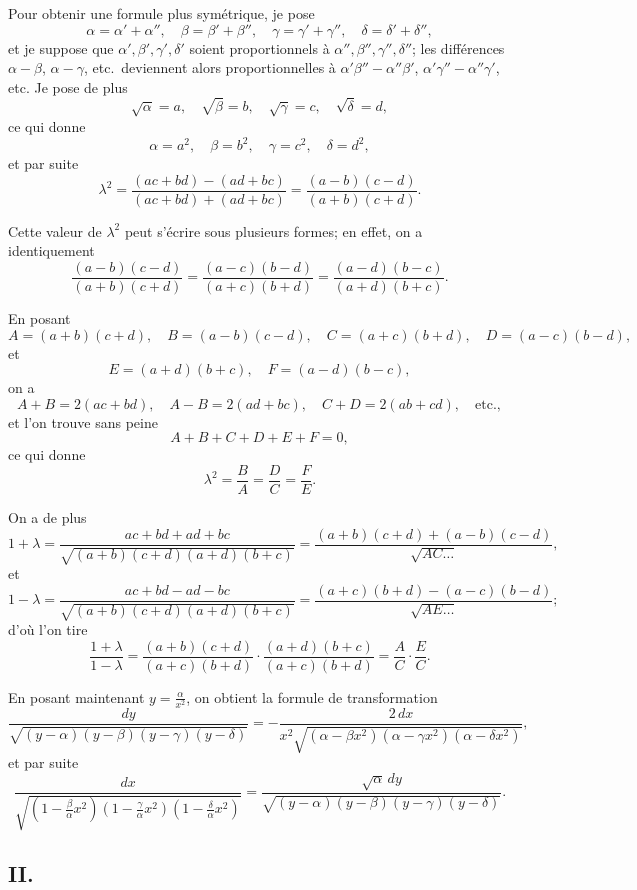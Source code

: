 \documentclass[11pt,a4paper]{article}
\begin{document}
Pour obtenir une formule plus symétrique, je pose
\[
\alpha = \alpha'+\alpha'', \quad \beta = \beta'+\beta'', \quad \gamma = \gamma'+\gamma'', \quad \delta = \delta'+\delta'',
\]
et je suppose que $\alpha',\beta',\gamma',\delta'$ soient proportionnels à $\alpha'',\beta'',\gamma'',\delta''$; les différences $\alpha-\beta$, $\alpha-\gamma$, etc.\ deviennent alors proportionnelles à $\alpha'\beta''-\alpha''\beta'$, $\alpha'\gamma''-\alpha''\gamma'$, etc. Je pose de plus
\[
\sqrt{\alpha} = a, \quad \sqrt{\beta} = b, \quad \sqrt{\gamma} = c, \quad \sqrt{\delta} = d,
\]
ce qui donne
\[
\alpha = a^2, \quad \beta = b^2, \quad \gamma = c^2, \quad \delta = d^2,
\]
et par suite
\[
\lambda^2 = \frac{(ac+bd)-(ad+bc)}{(ac+bd)+(ad+bc)} = \frac{(a-b)(c-d)}{(a+b)(c+d)}.
\]

\setcounter{page}{62}

Cette valeur de $\lambda^2$ peut s'écrire sous plusieurs formes; en effet, on a identiquement
\[
\frac{(a-b)(c-d)}{(a+b)(c+d)} = \frac{(a-c)(b-d)}{(a+c)(b+d)} = \frac{(a-d)(b-c)}{(a+d)(b+c)}.
\]

En posant
\[
A = (a+b)(c+d), \quad B = (a-b)(c-d), \quad C = (a+c)(b+d), \quad D = (a-c)(b-d),
\]
et
\[
E = (a+d)(b+c), \quad F = (a-d)(b-c),
\]
on a
\[
A+B = 2(ac+bd), \quad A-B = 2(ad+bc), \quad C+D = 2(ab+cd), \quad \text{etc.},
\]
et l'on trouve sans peine
\[
A+B+C+D+E+F = 0,
\]
ce qui donne
\[
\lambda^2 = \frac{B}{A} = \frac{D}{C} = \frac{F}{E}.
\]

\setcounter{page}{63}

On a de plus
\[
1+\lambda = \frac{ac+bd+ad+bc}{\sqrt{(a+b)(c+d)(a+d)(b+c)}} = \frac{(a+b)(c+d)+(a-b)(c-d)}{\sqrt{AC\ldots}},
\]
et
\[
1-\lambda = \frac{ac+bd-ad-bc}{\sqrt{(a+b)(c+d)(a+d)(b+c)}} = \frac{(a+c)(b+d)-(a-c)(b-d)}{\sqrt{AE\ldots}};
\]
d'où l'on tire
\[
\frac{1+\lambda}{1-\lambda} = \frac{(a+b)(c+d)}{(a+c)(b+d)} \cdot \frac{(a+d)(b+c)}{(a+c)(b+d)} = \frac{A}{C} \cdot \frac{E}{C}.
\]

En posant maintenant $y = \frac{\alpha}{x^2}$, on obtient la formule de transformation
\[
\frac{dy}{\sqrt{(y-\alpha)(y-\beta)(y-\gamma)(y-\delta)}}
= -\frac{2\,dx}{x^2\sqrt{(\alpha-\beta x^2)(\alpha-\gamma x^2)(\alpha-\delta x^2)}},
\]
et par suite
\[
\frac{dx}{\sqrt{(1-\frac{\beta}{\alpha}x^2)(1-\frac{\gamma}{\alpha}x^2)(1-\frac{\delta}{\alpha}x^2)}}
= \frac{\sqrt{\alpha}\,dy}{\sqrt{(y-\alpha)(y-\beta)(y-\gamma)(y-\delta)}}.
\]

\setcounter{page}{64}

\subsection*{II.}
\end{document}
